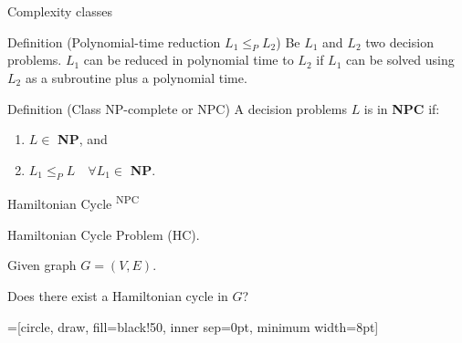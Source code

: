 \documentclass{beamer}
\begin{document}
\begin{frame}{Complexity classes}
\begin{block}{Definition (Polynomial-time reduction $L_1 \leq_P L_2$)}
Be $L_1$ and $L_2$ two decision problems. $L_1$ can be reduced in polynomial time to $L_2$ if $L_1$ can be solved using $L_2$ as a subroutine plus a polynomial time.
\end{block}

\begin{block}{Definition (Class NP-complete or NPC)}
A decision problems $L$ is in \textbf{NPC} if:
\begin{enumerate}
	\item $L \in $ \textbf{NP}, and
	\item $L_1 \leq_P L \quad \forall L_1 \in $ \textbf{NP}.
\end{enumerate}
\end{block}
\end{frame}



\begin{frame}{Hamiltonian Cycle \textsuperscript{NPC}}
\begin{description}[Parameters]
\item[Name] Hamiltonian Cycle Problem (HC).
\item[Parameters] Given graph $G=(V,E)$.
\item[Question] Does there exist a Hamiltonian cycle in $G$?
\end{description}

\begin{center}
=[circle, draw, fill=black!50, inner sep=0pt, minimum width=8pt]
\end{center}

\end{frame}
\end{document}
